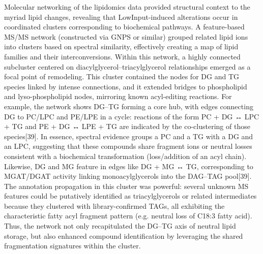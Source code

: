 \documentclass[10pt,letterpaper]{article}
\begin{document}
\begin{itemize}
Molecular networking of the lipidomics data provided structural context to the myriad lipid changes, revealing that LowInput-induced alterations occur in coordinated clusters corresponding to biochemical pathways. A feature-based MS/MS network (constructed via GNPS or similar) grouped related lipid ions into clusters based on spectral similarity, effectively creating a map of lipid families and their interconversions. Within this network, a highly connected subcluster centered on diacylglycerol–triacylglycerol relationships emerged as a focal point of remodeling. This cluster contained the nodes for DG and TG species linked by intense connections, and it extended bridges to phospholipid and lyso-phospholipid nodes, mirroring known acyl-editing reactions. For example, the network shows DG–TG forming a core hub, with edges connecting DG to PC/LPC and PE/LPE in a cycle: reactions of the form PC + DG ↔ LPC + TG and PE + DG ↔ LPE + TG are indicated by the co-clustering of those species[39]. In essence, spectral evidence groups a PC and a TG with a DG and an LPC, suggesting that these compounds share fragment ions or neutral losses consistent with a biochemical transformation (loss/addition of an acyl chain). Likewise, DG and MG feature in edges like DG + MG ↔ TG, corresponding to MGAT/DGAT activity linking monoacylglycerols into the DAG–TAG pool[39]. The annotation propagation in this cluster was powerful: several unknown MS features could be putatively identified as triacylglycerols or related intermediates because they clustered with library-confirmed TAGs, all exhibiting the characteristic fatty acyl fragment pattern (e.g. neutral loss of C18:3 fatty acid). Thus, the network not only recapitulated the DG–TG axis of neutral lipid storage, but also enhanced compound identification by leveraging the shared fragmentation signatures within the cluster.


\end{itemize}
\end{document}
